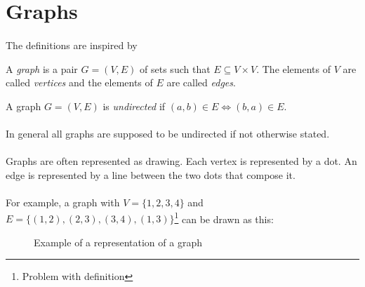 \section{Graphs}

\paragraph{}
The definitions are inspired by~\cite{diestel2017graph}

\begin{definition}[Graph]
  A \textit{graph} is a pair $G = (V, E)$ of sets such that $E \subseteq V \times V$. The elements of $V$ are called \textit{vertices} and the elements of $E$ are called \textit{edges}.
\end{definition}

\begin{definition}
  A graph $G = (V,E)$ is \textit{undirected} if $(a,b) \in E \Leftrightarrow (b,a) \in E$.
\end{definition}

\paragraph{}
In general all graphs are supposed to be undirected if not otherwise stated.

\paragraph{}
Graphs are often represented as drawing.  Each vertex is represented by a dot. An edge is represented by a line between the two dots that compose it.

\paragraph{}
For example, a graph with $V = \{1,2,3,4\}$ and $E = \{(1,2), (2,3), (3,4), (1,3)\}$\footnote{Problem with definition} can be drawn as this:

\begin{figure}[H]
  \begin{center}
    \caption{Example of a representation of a graph}
  \end{center}
\end{figure}


